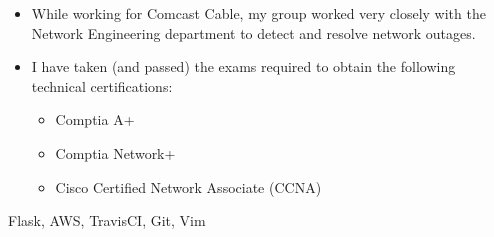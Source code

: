 \documentclass[letterpaper,11pt]{article}
\begin{document}
\begin{itemize}
    \begin{itemize}
        \item While working for Comcast Cable, my group worked very closely with the Network Engineering department to detect and resolve network outages.
        \item I have taken (and passed) the exams required to obtain the following technical certifications:
            \begin{itemize}
                \item Comptia A+
                \item Comptia Network+
                \item Cisco Certified Network Associate (CCNA)
            \end{itemize}
    \end{itemize}

     Flask, AWS, TravisCI, Git, Vim
\end{itemize}
\end{document}
